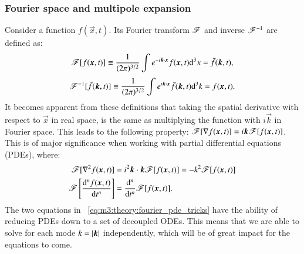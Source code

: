 \subsubsection{Fourier space and multipole expansion}
    Consider a function $f(\vec{x},t)$. Its Fourier transform $\mathscr{F}$ and inverse $\mathscr{F}^{-1}$ are defined as:
    \begin{equation}\label{eq:m3:theory:fourier_def}
            \mathscr{F}[f(\boldsymbol{x},t)]  \equiv \frac{1}{(2\pi)^{3/2}}\int e^{-i\boldsymbol{k}\cdot\boldsymbol{x}}f(\boldsymbol{x},t)\mathrm{d}^3 x = \tilde{f}(\boldsymbol{k},t),
    \end{equation}
    \begin{equation}\label{eq:m3:theory:fourier_inv_def}
        \mathscr{F}^{-1}[\tilde{f}(\boldsymbol{k},t)] \equiv \frac{1}{(2\pi)^{3/2}}\int e^{i\boldsymbol{k}\cdot\boldsymbol{x}}\tilde{f}(\boldsymbol{k},t)\mathrm{d}^3 k = f(\boldsymbol{x},t).
    \end{equation}
    It becomes apparent from these definitions that taking the spatial derivative with respect to $\vec{x}$ in real space, is the same as multiplying the function with $i\vec{k}$ in Fourier space. This leads to the following property: $\mathscr{F}[\nabla f(\boldsymbol{x},t)] = i\boldsymbol{k}\mathscr{F}[f(\boldsymbol{x},t)]$. This is of major significance when working with partial differential equations (PDEs), where:
    \begin{equation}\label{eq:m3:theory:fourier_pde_tricks}
        \begin{split}
            \mathscr{F}[\nabla^2f(\boldsymbol{x},t)] &= i^2\boldsymbol{k}\cdot\boldsymbol{k}\mathscr{F}[f(\boldsymbol{x},t)] = -k^2\mathscr{F}[f(\boldsymbol{x},t)]\\
            \mathscr{F}\left[\dv[n]{f(\ensuremath{\boldsymbol{x}},t)}{t}\right] &= \dv[n]{t}\mathscr{F}[f(\boldsymbol{x},t)].
        \end{split}
    \end{equation} 
    The two equations in ~\cref{eq:m3:theory:fourier_pde_tricks} have the ability of reducing PDEs down to a set of decoupled ODEs. This means that we are able to solve for each mode $k=\abs{\boldsymbol{k}}$ independently, which will be of great impact for the equations to come. 

